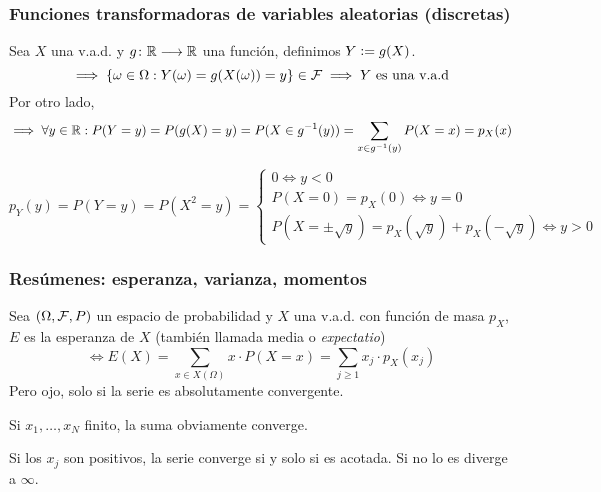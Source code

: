 \subsubsection{Funciones transformadoras de variables aleatorias (discretas)}
Sea $X$ una v.a.d. y $g \colon \mathbb{R} \longrightarrow \mathbb{R}$ una función, definimos $Y\vcentcolon= g(X)$.
\[\implies \{\omega \in\Omega:Y(\omega)=g(X(\omega))=y\} \in \mathcal{F} \implies Y\text{ es una v.a.d}\]
Por otro lado, 
\[\implies \forall y \in \mathbb{R}:P(Y=y)=P(g(X)=y)=P(X\in g^{-1}(y))=\sum_{x\in g^{-1}(y)}P(X=x)=p_X(x)\]

\begin{ejem}[$Y=x^2$]
    $$p_Y(y) = P(Y=y)=P(X^2=y)=\begin{cases}
        0 \iff y <0 \\
        P(X=0)=p_X(0) \iff y=0 \\
        P\left(X=\pm\sqrt{y}\right)=p_X\left(\sqrt{y}\right)+p_X\left(-\sqrt{y}\right) \iff y>0
    \end{cases}$$
\end{ejem}

\subsubsection{Resúmenes: esperanza, varianza, momentos}

\begin{defn}[Esperanza]
    Sea $(\Omega, \mathcal{F}, P)$ un espacio de probabilidad y $X$ una v.a.d. con función de masa $p_X$, $E$ es la esperanza de $X$ (también llamada media o \emph{expectatio})
    \[\iff E(X)=\sum_{x\in X(\Omega)}x\cdot P(X=x)=\sum_{j\geq 1}x_j\cdot p_X(x_j)\]
    Pero ojo, solo si la serie es absolutamente convergente.

    Si $x_1, \dots, x_N$ finito, la suma obviamente converge.
    
    Si los $x_j$ son positivos, la serie converge si y solo si es acotada. Si no lo es diverge a $\infty$.
\end{defn}

